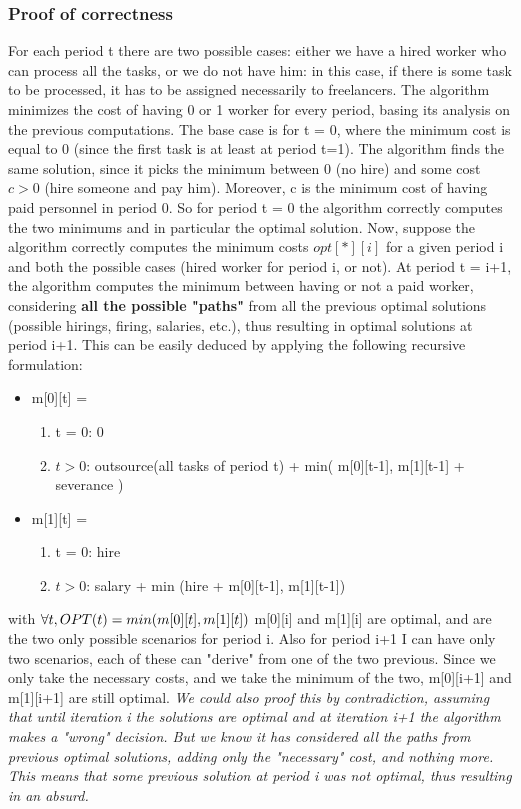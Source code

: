 \subsubsection{Proof of correctness}
For each period t there are two possible cases: either we have a hired worker who can process all the tasks, or we do not have him: in this case, if there is some task to be processed, it has to be assigned necessarily to freelancers. The algorithm minimizes the cost of having 0 or 1 worker for every period, basing its analysis on the previous computations. The base case is for t = 0, where the minimum cost is equal to 0 (since the first task is at least at period t=1). The algorithm finds the same solution, since it picks the minimum between 0 (no hire) and some cost $c > 0$ (hire someone and pay him). Moreover, c is the minimum cost of having paid personnel in period 0. So for period t = 0 the algorithm correctly computes the two minimums and in particular the optimal solution. Now, suppose the algorithm correctly computes the minimum costs $opt[*][i]$ for a given period i and both the possible cases (hired worker for period i, or not). At period t = i+1, the algorithm computes the minimum between having or not a paid worker, considering \textbf{all the possible "paths"} from all the previous optimal solutions (possible hirings, firing, salaries, etc.), thus resulting in optimal solutions at period i+1. This can be easily deduced by applying the following recursive formulation:
\begin{itemize}
	\item m[0][t] = 
	\begin{enumerate}
		\item t = 0: 0
		\item $t > 0$: outsource(all tasks of period t) + min( m[0][t-1], m[1][t-1] + severance )
	\end{enumerate}
	\item m[1][t] = 
	\begin{enumerate}
		\item t = 0: hire
		\item $t > 0$: salary + min (hire + m[0][t-1], m[1][t-1])
	\end{enumerate}
\end{itemize}
with $\forall t, OPT(t) = min (m[0][t], m[1][t]) \newline$
m[0][i] and m[1][i] are optimal, and are the two only possible scenarios for period i. Also for period i+1 I can have only two scenarios, each of these can "derive" from one of the two previous. Since we only take the necessary costs, and we take the minimum of the two, m[0][i+1] and m[1][i+1] are still optimal.
\textit{We could also proof this by contradiction, assuming that until iteration i the solutions are optimal and at iteration i+1 the algorithm makes a "wrong" decision. But we know it has considered all the paths from previous optimal solutions, adding only the "necessary" cost, and nothing more. This means that some previous solution at period i was not optimal, thus resulting in an absurd. 
}
